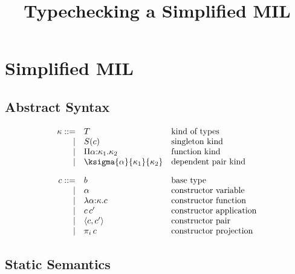\documentclass[twoside]{article}
\title{Typechecking a Simplified MIL}
\begin{document}
\maketitle

\section{Simplified MIL}

\subsection{Abstract Syntax}

\renewcommand{\ksingleton}[1]{S(#1)}
\renewcommand{\cfunction}[3]{\lambda #1{:}#2.#3}
\newcommand{\cpi}[2]{\capply{\pi_{#1}}{#2}}
\newcommand{\cpair}[2]{\langle{#1},{#2}\rangle}

\[
\begin{array}{rll}
\kind ::= &\ktype&\mbox{kind of types}\\
    |&\ksingleton{\constructor}&\mbox{singleton kind}\\
    |&\kpi{\cvar}{\kind_1}{\kind_2}&\mbox{function kind}\\
    |&\ksigma{\cvar}{\kind_1}{\kind_2}&\mbox{dependent pair kind}\\[10pt]

\constructor ::= &\basetype&\mbox{base type}\\
    |&\cvar&\mbox{constructor variable}\\
    |&\cfunction{\cvar}{\kind}{\constructor}
         &\mbox{constructor function}\\
    |&\capply{\constructor}{\constructor'}&\mbox{constructor application}\\
    |&\cpair{\constructor}{\constructor'}&\mbox{constructor pair}\\
    |&\cpi{i}{\constructor}&\mbox{constructor projection}\\
\end{array}
\]

\subsection{Static Semantics}


\infrule
  {}
  {\validcontext{\emptycontext}}

\infrule
  {\validkind{\context}{\kind}\qquad
     \cvar\not\in\BV{\context}}
  {\validcontext{\emptycontext,\sbindconstructor{\cvar}{\kind}}}
\end{document}
